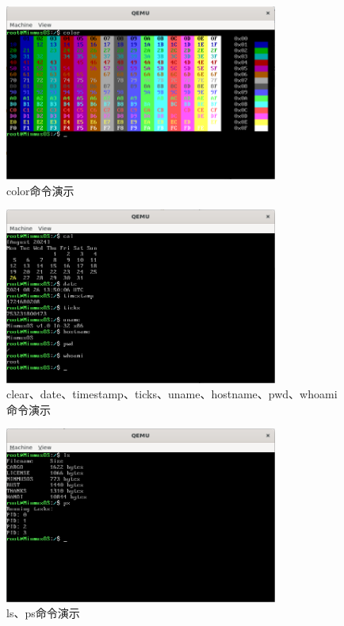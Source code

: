 \begin{figure}[htbp]
    \centering
    \includegraphics[width=0.8\textwidth]{figures/ColorCommandPresentation.png}
    \caption{color命令演示}
\end{figure}

\begin{figure}[htbp]
    \centering
    \includegraphics[width=0.8\textwidth]{figures/CalDateTimestampTicksUnameHostnamePwdWhoamiCommandPresentation.png}
    \caption{clear、date、timestamp、ticks、uname、hostname、pwd、whoami命令演示}
\end{figure}

\begin{figure}[htbp]
    \centering
    \includegraphics[width=0.8\textwidth]{figures/LsPsCommandPresentation.png}
    \caption{ls、ps命令演示}
\end{figure}

